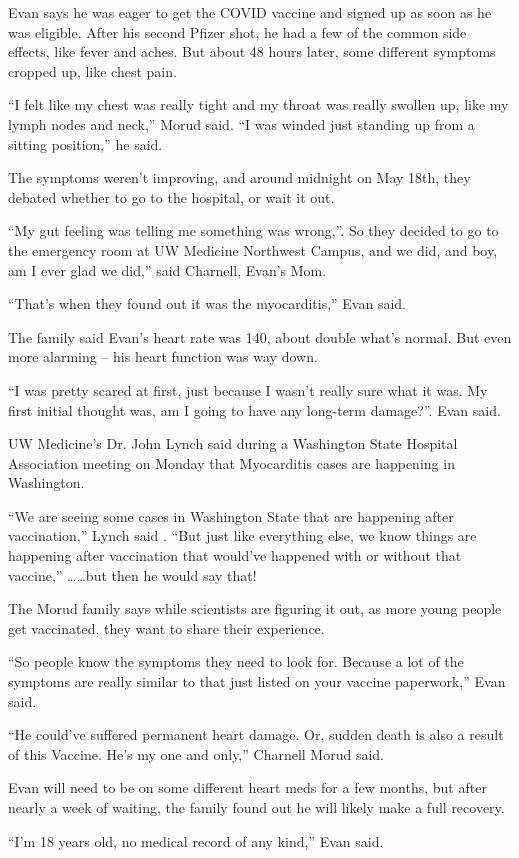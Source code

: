 Evan says he was eager to get the COVID vaccine and signed up as soon as he was
eligible. After his second Pfizer shot, he had a few of the common side effects,
like fever and aches. But about 48 hours later, some different symptoms cropped
up, like chest pain.

“I felt like my chest was really tight and my throat was really swollen up, like
my lymph nodes and neck,” Morud said. “I was winded just standing up from a
sitting position,” he said.

The symptoms weren’t improving, and around midnight on May 18th, they debated
whether to go to the hospital, or wait it out.

“My gut feeling was telling me something was wrong,”. So they decided to go to
the emergency room at UW Medicine Northwest Campus, and we did, and boy, am I
ever glad we did,” said Charnell, Evan’s Mom.

“That’s when they found out it was the myocarditis,” Evan said.

The family said Evan’s heart rate was 140, about double what’s normal. But even
more alarming – his heart function was way down.

“I was pretty scared at first, just because I wasn’t really sure what it was. My
first initial thought was, am I going to have any long-term damage?”. Evan said.

UW Medicine’s Dr. John Lynch said during a Washington State Hospital Association
meeting on Monday that Myocarditis cases are happening in Washington.

“We are seeing some cases in Washington State that are happening after
vaccination,” Lynch said . “But just like everything else, we know things are
happening after vaccination that would’ve happened with or without that
vaccine,” ……but then he would say that!

The Morud family says while scientists are figuring it out, as more young people get vaccinated, they want to share their experience.

“So people know the symptoms they need to look for. Because a lot of the
symptoms are really similar to that just listed on your vaccine paperwork,” Evan
said.

“He could’ve suffered permanent heart damage. Or, sudden death is also a result
of this Vaccine. He’s my one and only,” Charnell Morud said.

Evan will need to be on some different heart meds for a few months, but after
nearly a week of waiting, the family found out he will likely make a full
recovery.

“I’m 18 years old, no medical record of any kind,” Evan said.

